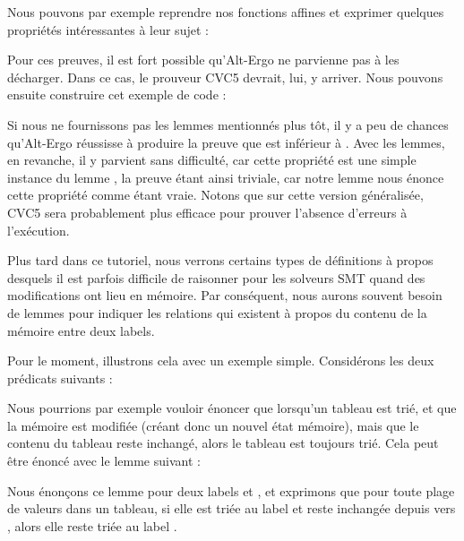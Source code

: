 

Nous pouvons par exemple reprendre nos fonctions affines et exprimer quelques
propriétés intéressantes à leur sujet :






Pour ces preuves, il est fort possible qu'Alt-Ergo ne parvienne pas à les
décharger. Dans ce cas, le prouveur CVC5 devrait, lui, y arriver. Nous pouvons
ensuite construire cet exemple de code :






Si nous ne fournissons pas les lemmes mentionnés plus tôt, il y a peu de chances
qu'Alt-Ergo réussisse à produire la preuve que  est inférieur à .
Avec les lemmes, en revanche, il y parvient sans difficulté, car cette
propriété est une simple instance du lemme , la preuve
étant ainsi triviale, car notre lemme nous énonce cette propriété comme étant vraie.
Notons que sur cette version généralisée, CVC5 sera probablement plus efficace pour
prouver l'absence d'erreurs à l'exécution.





Plus tard dans ce tutoriel, nous verrons certains types de définitions à propos
desquels il est parfois difficile de raisonner pour les solveurs SMT quand des
modifications ont lieu en mémoire. Par conséquent, nous aurons souvent besoin de
lemmes pour indiquer les relations qui existent à propos du contenu de la mémoire
entre deux labels.


Pour le moment, illustrons cela avec un exemple simple. Considérons les deux
prédicats suivants :




Nous pourrions par exemple vouloir énoncer que lorsqu'un tableau est trié, et que
la mémoire est modifiée (créant donc un nouvel état mémoire), mais que le contenu du
tableau reste inchangé, alors le tableau est toujours trié. Cela peut être énoncé
avec le lemme suivant :




Nous énonçons ce lemme pour deux labels  et , et
exprimons que pour toute plage de valeurs dans un tableau, si elle est triée au label
 et reste inchangée depuis  vers ,
alors elle reste triée au label .


